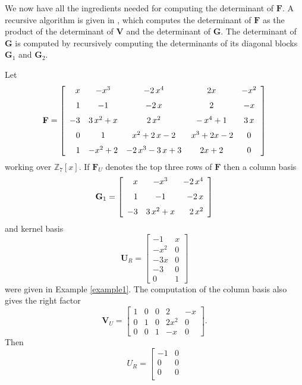 We now have all the ingredients needed for computing the determinant
of $\mathbf{F}$. A recursive algorithm is given in ,
which computes the determinant of $\mathbf{F}$ as the product of
the determinant of $\mathbf{V}$ and the determinant of $\mathbf{G}$.
The determinant of $\mathbf{G}$ is computed by recursively computing
the determinants of its diagonal blocks $\mathbf{G}_{1}$ and $\mathbf{G}_{2}$.


\begin{example}
Let 
\[
\mathbf{F}=\left[\begin{array}{rcccc}
x & -{x}^{3} & -2\,{x}^{4} & 2x & -{x}^{2}\\
\noalign{\medskip}1 & -1 & -2\, x & 2 & -x\\
\noalign{\medskip}-3 & 3\,{x}^{2}+x & 2\,{x}^{2} & -\,{x}^{4}+1 & 3\, x\\
\noalign{\medskip}0 & 1 & {x}^{2}+2\, x-2 & \,{x}^{3}+2x-2 & 0\\
\noalign{\medskip}1 & -{x}^{2}+2 & -2\,{x}^{3}-3\, x+3 & 2x+2 & 0
\end{array}\right]
\]
 working over $\mathbb{Z}_{7}[x]$. If $\mathbf{F}_{U}$ denotes the
top three rows of $\mathbf{F}$ then a column basis 
\[
\mathbf{G}_{1}=\left[\begin{array}{rcr}
x & -{x}^{3} & -2\,{x}^{4}\\
\noalign{\medskip}1 & -1 & -2\, x\\
\noalign{\medskip}-3 & 3\,{x}^{2}+x & 2\,{x}^{2}
\end{array}\right]
\]
 and kernel basis 
\[
\mathbf{U}_{R}=\left[\begin{array}{rc}
-1 & x\\
-x^{2} & 0\\
-3x & 0\\
-3 & 0\\
0 & 1
\end{array}\right]
\]
 were given in Example \ref{example1}. The computation of the column
basis also gives the right factor 
\[
\mathbf{V}_{U}=\left[\begin{array}{cccrr}
1 & 0 & 0 & 2 & -x\\
0 & 1 & 0 & 2x^{2} & 0\\
0 & 0 & 1 & -x & 0
\end{array}\right].
\]
Then 
\[
{U}_{R}=\left[\begin{array}{rc}
-1 & 0\\
0 & 0\\
0 & 0\\

\end{array}\]
\end{example}
